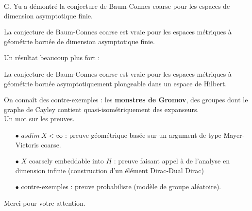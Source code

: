 \documentclass{beamer}
\begin{document}
\begin{frame}
G. Yu a démontré la conjecture de Baum-Connes coarse pour les espaces de dimension asymptotique finie.
\begin{thm}[G. Yu '98]
La conjecture de Baum-Connes coarse est vraie pour les espaces métriques à géométrie bornée de dimension asymptotique finie. 
\end{thm}
 Un résultat beaucoup plus fort :
\begin{thm}[G. Yu '00]
La conjecture de Baum-Connes coarse est vraie pour les espaces métriques à géométrie bornée asymptotiquement plongeable dans un espace de Hilbert. 
\end{thm}
\end{frame}

\begin{frame}
On connaît des contre-exemples : les \textbf{monstres de Gromov}, des groupes dont le graphe de Cayley contient quasi-isométriquement des expanseurs.\\
Un mot sur les preuves.
\begin{itemize}
\item[$\bullet$]  $asdim\ X<\infty$ : preuve géométrique basée sur un argument de type Mayer-Vietoris coarse.
\item[$\bullet$]  $X$ coarsely embeddable into $H$ : preuve faisant appel à de l'analyse en dimension infinie (construction d'un élément Dirac-Dual Dirac)
\item[$\bullet$] contre-exemples : preuve probabiliste (modèle de groupe aléatoire).
\end{itemize}
\end{frame}

\begin{frame}
Merci pour votre attention.
\end{frame}
\end{document}
